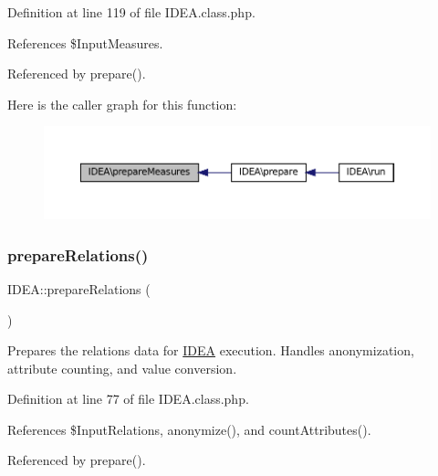 Definition at line 119 of file I\+D\+E\+A.\+class.\+php.



References \$\+Input\+Measures.



Referenced by prepare().

Here is the caller graph for this function\+:\nopagebreak
\begin{figure}[H]
\begin{center}
\leavevmode
\includegraphics[width=350pt]{class_i_d_e_a_a236cabd79a85f11694d1a3fd2506a64b_icgraph}
\end{center}
\end{figure}
\mbox{\label{class_i_d_e_a_a7b775135905a443175ab2b6c7c4a7503}} 
\subsubsection{\texorpdfstring{prepare\+Relations()}{prepareRelations()}}
{\footnotesize\ttfamily I\+D\+E\+A\+::prepare\+Relations (\begin{DoxyParamCaption}{ }\end{DoxyParamCaption})\hspace{0.3cm}{\ttfamily [protected]}}

Prepares the relations data for \hyperlink{class_i_d_e_a}{I\+D\+EA} execution. Handles anonymization, attribute counting, and value conversion. 

Definition at line 77 of file I\+D\+E\+A.\+class.\+php.



References \$\+Input\+Relations, anonymize(), and count\+Attributes().



Referenced by prepare().

